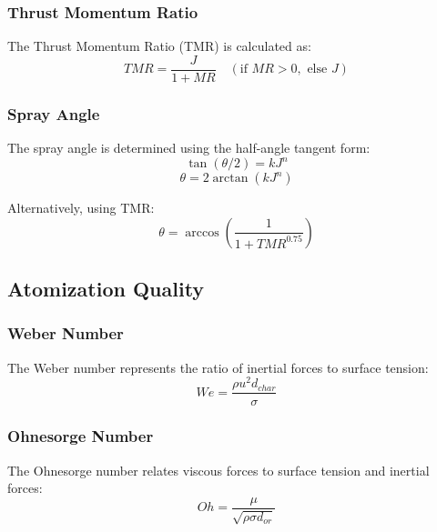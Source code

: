 \subsubsection{Thrust Momentum Ratio}
The Thrust Momentum Ratio (TMR) is calculated as:
\begin{equation}
TMR = \frac{J}{1 + MR} \quad (\text{if } MR > 0, \text{ else } J)
\end{equation}

\subsubsection{Spray Angle}
The spray angle is determined using the half-angle tangent form:
\begin{equation}
\tan(\theta/2) = k J^n
\end{equation}
\begin{equation}
\theta = 2 \arctan(k J^n)
\end{equation}

Alternatively, using TMR:
\begin{equation}
\theta = \arccos\left(\frac{1}{1 + TMR^{0.75}}\right)
\end{equation}

\subsection{Atomization Quality}

\subsubsection{Weber Number}
The Weber number represents the ratio of inertial forces to surface tension:
\begin{equation}
We = \frac{\rho u^2 d_{char}}{\sigma}
\end{equation}

\subsubsection{Ohnesorge Number}
The Ohnesorge number relates viscous forces to surface tension and inertial forces:
\begin{equation}
Oh = \frac{\mu}{\sqrt{\rho \sigma d_{or}}}
\end{equation}

